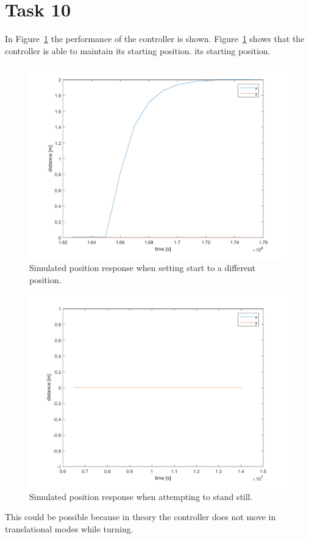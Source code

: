 \documentclass[a4paper,12pt,oneside,onecolumn]{article} %
\begin{document}
\section*{Task 10}
In Figure~\ref{fig:task10_stepplot} the performance of the controller is shown.
Figure~\ref{fig:task10_stepplot} shows that the controller is able to maintain its starting position. 
its starting position.  \begin{figure}[H]
        \centering
        \includegraphics[scale = 0.5]{../matlab/images/task10_stepplot.png}
        \caption{Simulated position response when setting start to a different position.}
        \label{fig:task10_stepplot}
    \end{figure}
    
    \begin{figure}[H]
        \centering
        \includegraphics[scale = 0.5]{../matlab/images/task10_stillplot.png}
        \caption{Simulated position response when attempting to stand still.}
        \label{fig:task10_stillplot}
    \end{figure}
This could be possible because in theory the controller does not move in translational modes while turning.
\end{document}
